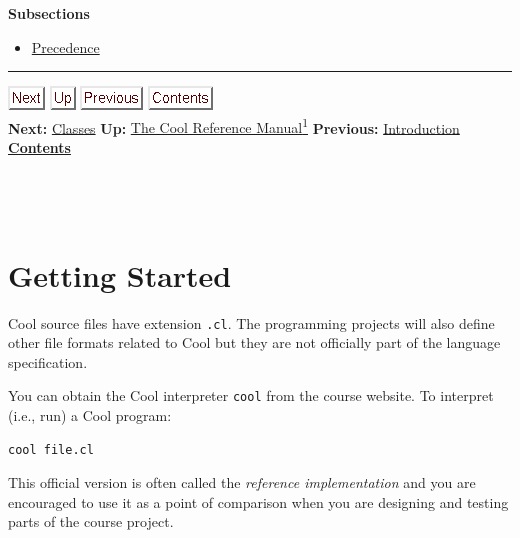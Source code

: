 \documentclass[]{article}
\begin{document}
\textbf{Subsections}

\begin{itemize}
\itemsep1pt\parskip0pt
\item
  \href{node40.html}{Precedence}
\end{itemize}

\begin{center}\rule{3in}{0.4pt}\end{center}

\href{node4.html}{\includegraphics{next.png}}
\href{cool-manual.html}{\includegraphics{up.png}}
\href{node2.html}{\includegraphics{prev.png}}
\href{node1.html}{\includegraphics{contents.png}} \\ \textbf{Next:}
\href{node4.html}{Classes} \textbf{Up:} \href{cool-manual.html}{The Cool
Reference Manual\textsuperscript{1}} \textbf{Previous:}
\href{node2.html}{Introduction} ~ \textbf{\href{node1.html}{Contents}}
\\ \\

\section{\\ Getting Started}

Cool source files have extension \texttt{.cl}. The programming projects
will also define other file formats related to Cool but they are not
officially part of the language specification.

You can obtain the Cool interpreter \texttt{cool} from the course
website. To interpret (i.e., run) a Cool program:

\begin{verbatim}
cool file.cl 
\end{verbatim}

This official version is often called the \emph{reference
implementation} and you are encouraged to use it as a point of
comparison when you are designing and testing parts of the course
project.
\end{document}
